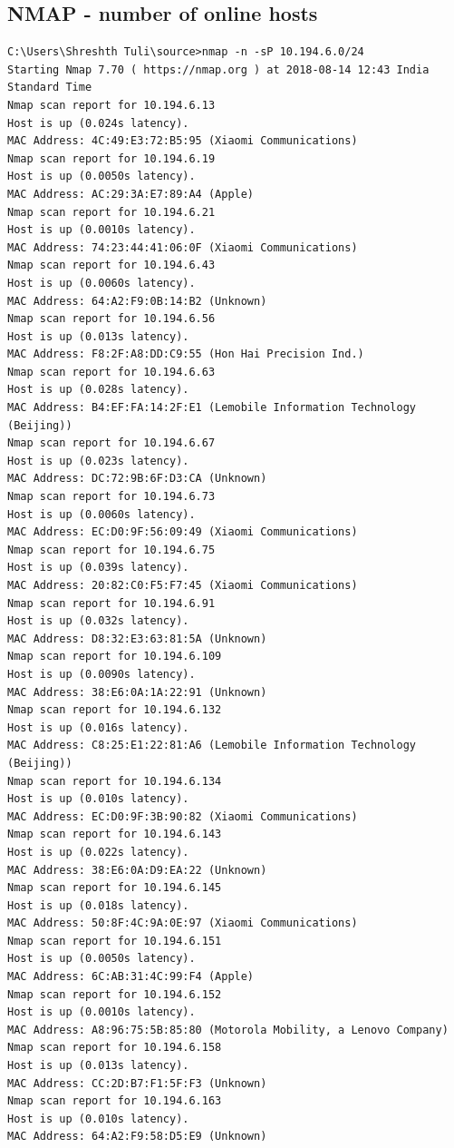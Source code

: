 \documentclass[a4paper, 11pt]{article}
\begin{document}
\begin{appendices}
\subsection{NMAP - number of online hosts}
\label{appendix:nmap_online}
\begin{lstlisting}[style=BashInputStyle]
C:\Users\Shreshth Tuli\source>nmap -n -sP 10.194.6.0/24
Starting Nmap 7.70 ( https://nmap.org ) at 2018-08-14 12:43 India Standard Time
Nmap scan report for 10.194.6.13
Host is up (0.024s latency).
MAC Address: 4C:49:E3:72:B5:95 (Xiaomi Communications)
Nmap scan report for 10.194.6.19
Host is up (0.0050s latency).
MAC Address: AC:29:3A:E7:89:A4 (Apple)
Nmap scan report for 10.194.6.21
Host is up (0.0010s latency).
MAC Address: 74:23:44:41:06:0F (Xiaomi Communications)
Nmap scan report for 10.194.6.43
Host is up (0.0060s latency).
MAC Address: 64:A2:F9:0B:14:B2 (Unknown)
Nmap scan report for 10.194.6.56
Host is up (0.013s latency).
MAC Address: F8:2F:A8:DD:C9:55 (Hon Hai Precision Ind.)
Nmap scan report for 10.194.6.63
Host is up (0.028s latency).
MAC Address: B4:EF:FA:14:2F:E1 (Lemobile Information Technology (Beijing))
Nmap scan report for 10.194.6.67
Host is up (0.023s latency).
MAC Address: DC:72:9B:6F:D3:CA (Unknown)
Nmap scan report for 10.194.6.73
Host is up (0.0060s latency).
MAC Address: EC:D0:9F:56:09:49 (Xiaomi Communications)
Nmap scan report for 10.194.6.75
Host is up (0.039s latency).
MAC Address: 20:82:C0:F5:F7:45 (Xiaomi Communications)
Nmap scan report for 10.194.6.91
Host is up (0.032s latency).
MAC Address: D8:32:E3:63:81:5A (Unknown)
Nmap scan report for 10.194.6.109
Host is up (0.0090s latency).
MAC Address: 38:E6:0A:1A:22:91 (Unknown)
Nmap scan report for 10.194.6.132
Host is up (0.016s latency).
MAC Address: C8:25:E1:22:81:A6 (Lemobile Information Technology (Beijing))
Nmap scan report for 10.194.6.134
Host is up (0.010s latency).
MAC Address: EC:D0:9F:3B:90:82 (Xiaomi Communications)
Nmap scan report for 10.194.6.143
Host is up (0.022s latency).
MAC Address: 38:E6:0A:D9:EA:22 (Unknown)
Nmap scan report for 10.194.6.145
Host is up (0.018s latency).
MAC Address: 50:8F:4C:9A:0E:97 (Xiaomi Communications)
Nmap scan report for 10.194.6.151
Host is up (0.0050s latency).
MAC Address: 6C:AB:31:4C:99:F4 (Apple)
Nmap scan report for 10.194.6.152
Host is up (0.0010s latency).
MAC Address: A8:96:75:5B:85:80 (Motorola Mobility, a Lenovo Company)
Nmap scan report for 10.194.6.158
Host is up (0.013s latency).
MAC Address: CC:2D:B7:F1:5F:F3 (Unknown)
Nmap scan report for 10.194.6.163
Host is up (0.010s latency).
MAC Address: 64:A2:F9:58:D5:E9 (Unknown)

\end{lstlisting}
\end{appendices}
\end{document}

